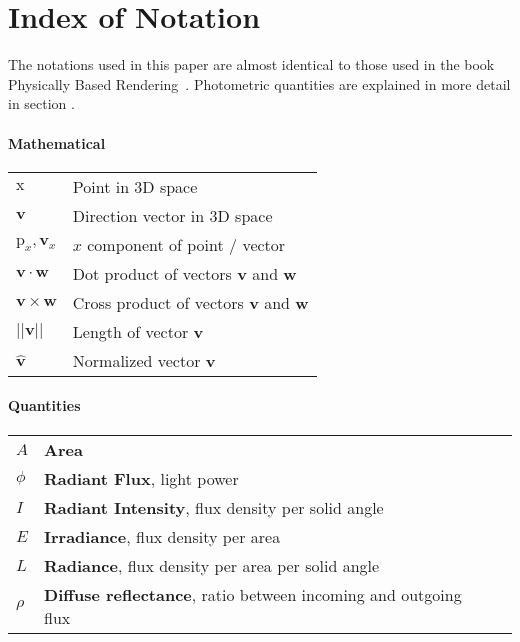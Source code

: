 \documentclass[thesis.tex]{subfiles}
\begin{document}
\chapter*{Index of Notation}

The notations used in this paper are almost identical to those used in the book Physically Based Rendering~\cite{bib:pbrt}. Photometric quantities are explained in more detail in section .

\subsubsection*{Mathematical}

\begin{tabular}{ l l }
$\mathrm{x}$ & Point in 3D space \\
$\mathbf{v}$ & Direction vector in 3D space \\
$\mathrm{p}_x, \mathbf{v}_x$ & $x$ component of point / vector\\
$\mathbf{v} \cdot \mathbf{w}$ & Dot product of vectors $\mathbf{v}$ and $\mathbf{w}$\\
$\mathbf{v} \times \mathbf{w}$ & Cross product of vectors $\mathbf{v}$ and $\mathbf{w}$\\
$||\mathbf{v}||$ & Length of vector $\mathbf{v}$\\
$\hat{\mathbf{v}}$ & Normalized vector $\mathbf{v}$
\end{tabular}


\subsubsection*{Quantities}

\begin{tabular}{ l l l}
$A$ & \textbf{Area}\\
$\phi$ & \textbf{Radiant Flux}, light power\\
$I$ & \textbf{Radiant Intensity}, flux density per solid angle\\
$E$ & \textbf{Irradiance}, flux density per area\\
$L$ & \textbf{Radiance}, flux density per area per solid angle\\
$\rho$ & \textbf{Diffuse reflectance}, ratio between incoming and outgoing flux\\
\end{tabular}
\end{document}
